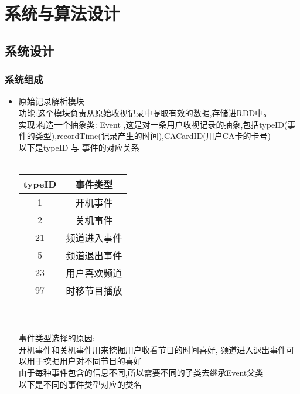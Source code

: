 \documentclass{hitreport}
\begin{document}
\begin{flushleft}
\end{flushleft}

\section{系统与算法设计}
\subsection{系统设计}
\subsubsection{系统组成}
\begin{itemize}
  \item 原始记录解析模块\\
        功能:这个模块负责从原始收视记录中提取有效的数据,存储进RDD中。\\
        实现:构造一个抽象类: Event ,这是对一条用户收视记录的抽象,包括typeID(事件的类型),recordTime(记录产生的时间),CACardID(用户CA卡的卡号)\\
        以下是typeID 与 事件的对应关系\\
        ~\\
        \begin{tabular}{|c|c|}
          \hline
          typeID & 事件类型     \\
          \hline
          1      & 开机事件     \\ \hline
          2      & 关机事件     \\ \hline
          21     & 频道进入事件 \\ \hline
          5      & 频道退出事件 \\ \hline
          23     & 用户喜欢频道 \\ \hline
          97     & 时移节目播放 \\ \hline
        \end{tabular}\\
        ~\\
        事件类型选择的原因:\\
        开机事件和关机事件用来挖掘用户收看节目的时间喜好,
        频道进入退出事件可以用于挖掘用户对不同节目的喜好\\
        由于每种事件包含的信息不同,所以需要不同的子类去继承Event父类\\
        以下是不同的事件类型对应的类名\\
        ~\\
        \begin{tabular}{|c|c|}

\end{tabular}
\end{itemize}
\end{document}
